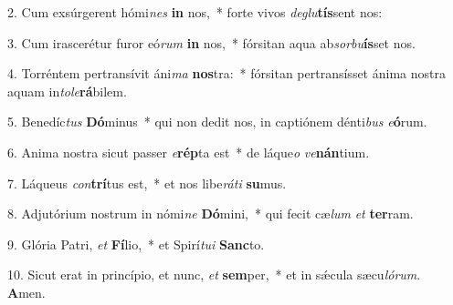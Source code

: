 2. Cum exsúrgerent hómi\textit{nes} \textbf{in} nos,~*  forte vivos \textit{de}\textit{glu}\textbf{tís}sent nos:\

3. Cum irascerétur furor eó\textit{rum} \textbf{in} nos,~*  fórsitan aqua ab\textit{sor}\textit{bu}\textbf{ís}set nos.\

4. Torréntem pertransívit áni\textit{ma} \textbf{nos}tra:~*  fórsitan pertransísset ánima nostra aquam in\textit{to}\textit{le}\textbf{rá}bilem.\

5. Benedíc\textit{tus} \textbf{Dó}minus~*  qui non dedit nos, in captiónem dénti\textit{bus} \textit{e}\textbf{ó}rum.\

6. Anima nostra sicut passer \textit{e}\textbf{rép}ta est~*  de láque\textit{o} \textit{ve}\textbf{nán}tium.\

7. Láqueus \textit{con}\textbf{trí}tus est,~*  et nos libe\textit{rá}\textit{ti} \textbf{su}mus.\

8. Adjutórium nostrum in nómi\textit{ne} \textbf{Dó}mini,~*  qui fecit cæ\textit{lum} \textit{et} \textbf{ter}ram.\

9. Glória Patri, \textit{et} \textbf{Fí}lio,~*  et Spirí\textit{tu}\textit{i} \textbf{Sanc}to.\

10. Sicut erat in princípio, et nunc, \textit{et} \textbf{sem}per,~*  et in sǽcula sæcu\textit{ló}\textit{rum}. \textbf{A}men.\

